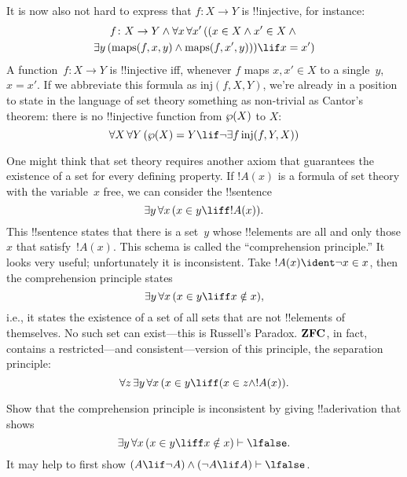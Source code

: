 \documentclass[../../../include/open-logic-section]{subfiles}
\begin{document}
It is now also not hard to express that $f\colon X \to Y$ is
!!{injective}, for instance:
\begin{multline*}
 f \colon X \to Y \land \lforall[x][\lforall[x'][((x \in X \land x' \in
     X \land {}]] \\
 \lexists[y][(\mathrm{maps}(f, x, y) \land \mathrm{maps}(f,
        x', y))]) \lif x = x')
\end{multline*}
A function~$f\colon X \to Y$ is !!{injective} iff, whenever $f$ maps $x, x'
\in X$ to a single~$y$, $x = x'$.  If we abbreviate this formula as
$\mathrm{inj}(f, X, Y)$, we're already in a position to state in the
language of set theory something as non-trivial as Cantor's theorem:
there is no !!{injective} function from $\wp(X)$ to $X$:
\[
\lforall[X][\lforall[Y][(\Pow{X} = Y \lif
    \lnot\lexists[f][\mathrm{inj}(f, Y, X)])]]
\]

One might think that set theory requires another axiom that guarantees
the existence of a set for every defining property. If $!A(x)$ is a
formula of set theory with the variable~$x$ free, we can consider the
!!{sentence}
\[
\lexists[y][\lforall[x][(x \in y \liff !A(x))]].
\]
This !!{sentence} states that there is a set~$y$ whose !!{element}s
are all and only those $x$ that satisfy~$!A(x)$. This schema is called
the ``comprehension principle.''  It looks very useful; unfortunately
it is inconsistent.  Take $!A(x) \ident \lnot x \in x$, then the
comprehension principle states
\[
\lexists[y][\lforall[x][(x \in y \liff x \notin x)]],
\]
i.e., it states the existence of a set of all sets that are not
!!{element}s of themselves. No such set can exist---this is Russell's
Paradox.  $\Log{ZFC}$, in fact, contains a restricted---and
consistent---version of this principle, the separation principle:
\[
\lforall[z][\lexists[y][\lforall[x][(x \in y \liff (x \in z \land
      !A(x))]]].
\]

\begin{prob}
Show that the comprehension principle is inconsistent by giving
!!a{derivation} that shows
\[
\lexists[y][\lforall[x][(x \in y \liff x \notin x)]] \Proves \lfalse.
\]
It may help to first show $(A \lif \lnot A) \land (\lnot A \lif A)
\Proves \lfalse$.
\end{prob}
\end{document}
